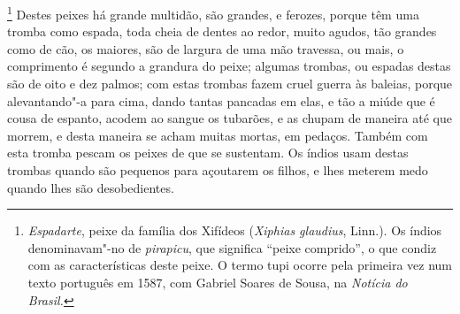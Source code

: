 \begin{linenumbers}
\footnote{ \textit{Espadarte}, peixe da família dos
Xifídeos (\textit{Xiphias glaudius}, Linn.). Os índios denominavam"-no
de \textit{pirapicu}, que significa ``peixe comprido'', o que condiz
com as características deste peixe. O termo tupi ocorre pela primeira
vez num texto português em 1587, com Gabriel Soares de Sousa, na
\textit{Notícia do Brasil.}} Destes peixes há grande
multidão, são grandes, e ferozes, porque têm uma tromba como espada,
toda cheia de dentes ao redor, muito agudos, tão grandes como de cão,
os maiores, são de largura de uma mão travessa, ou mais, o comprimento
é segundo a grandura do peixe; algumas trombas, ou espadas destas são
de oito e dez palmos; com estas trombas fazem cruel guerra às baleias,
porque alevantando"-a para cima, dando tantas pancadas em elas, e tão a
miúde que é cousa de espanto, acodem ao sangue os tubarões, e as chupam
de maneira até que morrem, e desta maneira se acham muitas mortas, em
pedaços. Também com esta tromba pescam os peixes de que se sustentam.
Os índios usam destas trombas quando são pequenos para açoutarem os
filhos, e lhes meterem medo quando lhes são desobedientes.


\end{linenumbers}
